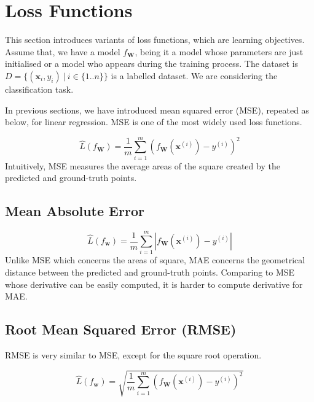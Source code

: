 \section{Loss Functions}

This section introduces variants of loss functions, which are learning objectives. %
Assume that, we have a model $f_{\textbf{W}}$, being it a model whose parameters are just initialised or a model who appears during the training process. The dataset is $D=\{(\textbf{x}_i,y_i)~|~i\in \{1..n\}\}$ is a labelled dataset. We are considering the classification task. 

In previous sections, we have introduced mean squared error (MSE), repeated as below, for linear regression. MSE is one of the most widely used loss functions. 


\begin{equation}\label{equ:mseloss}
    \hat{L}(f_\textbf{W}) = \frac{1}{m}\sum_{i=1}^m(f_{\textbf{W}   }(\textbf{x}^{(i)})-y^{(i)})^2
\end{equation}
Intuitively, MSE measures the average areas of the square created by the predicted and ground-truth points. 

\subsection*{Mean Absolute Error}

\begin{equation}\label{equ:maeloss}
    \hat{L}(f_\textbf{w}) = \frac{1}{m}\sum_{i=1}^m|f_{\textbf{W}}(\textbf{x}^{(i)})-y^{(i)}|
\end{equation}
Unlike MSE which concerns the areas of square, MAE concerns the geometrical distance between 
the predicted and ground-truth points. Comparing to MSE whose derivative can be easily computed, it is harder to compute derivative for MAE. 

\subsection*{Root Mean Squared Error (RMSE)}

RMSE is very similar to MSE, except for the square root operation. 

\begin{equation}\label{equ:rmseloss}
    \hat{L}(f_\textbf{w}) = \sqrt{\frac{1}{m}\sum_{i=1}^m(f_{\textbf{W}}(\textbf{x}^{(i)})-y^{(i)})^2}
\end{equation}

